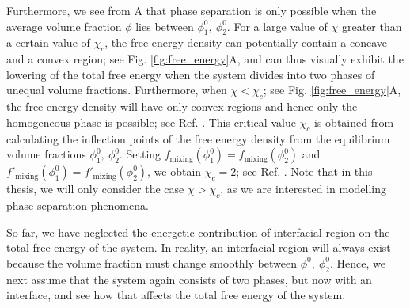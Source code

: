 Furthermore, we see from A that phase separation is only possible when the average volume fraction $\overline{\phi}$ lies between $\phi^0_1,~\phi^0_2$.
For a large value of $\chi$ greater than a certain value of $\chi_c$, the free energy density can potentially contain a concave and a convex region; see Fig. \ref{fig:free_energy}A, and can thus visually exhibit the lowering of the total free energy when the system divides into two phases of unequal volume fractions.
Furthermore, when $\chi < \chi_c$; see Fig. \ref{fig:free_energy}A, the free energy density will have only convex regions and hence only the homogeneous phase is possible; see Ref. \cite{Review2019}.
This critical value $\chi_c$ is obtained from calculating the inflection points of the free energy density from the equilibrium volume fractions $\phi^0_1,~\phi^0_2$.
Setting $f_\mathrm{mixing} (\phi^0_1) = f_\mathrm{mixing} (\phi^0_2)$ and $f'_\mathrm{mixing} (\phi^0_1) = f'_\mathrm{mixing} (\phi^0_2)$, we obtain $\chi_c = 2$; see Ref. \cite{Review2019}.
Note that in this thesis, we will only consider the case $\chi > \chi_c$, as we are interested in modelling phase separation phenomena. 

So far, we have neglected the energetic contribution of interfacial region on the total free energy of the system.
In reality, an interfacial region will always exist because the volume fraction must change smoothly between $\phi^0_1,~\phi^0_2$.
Hence, we next assume that the system again consists of two phases, but now with an interface, and see how that affects the total free energy of the system.

\clearpage

